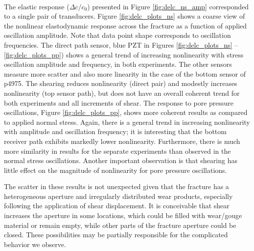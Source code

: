 \documentclass[letterpaper,10pt]{article}
\begin{document}
	\paragraph{}
	The elastic response ($ \Delta c/c_0 $) presented in Figure \ref{fig:delc_ns_amp} corresponded to a single pair of transducers. 
	Figure \ref{fig:delc_plots_ns} shows a coarse view of the nonlinear elastodynamic response across the fracture as a function of applied oscillation amplitude. Note that data point shape corresponds to oscillation frequencies. The direct path sensor, blue PZT in Figures \ref{fig:delc_plots_ns} -- \ref{fig:delc_plots_pp}) shows a general trend of increasing nonlinearity with stress oscillation amplitude and frequency, in both experiments. The other sensors measure more scatter and also more linearity in the case of the bottom sensor of p4975. The shearing reduces nonlinearity (direct pair) and modestly increases nonlinearity (top sensor path), but does not have an overall coherent trend for both experiments and all increments of shear.
	The response to pore pressure oscillations, Figure \ref{fig:delc_plots_pp}, shows more coherent results as compared to applied normal stress. Again, there is a general trend in increasing nonlinearity with amplitude and oscillation frequency; it is interesting that the bottom receiver path exhibits markedly lower nonlinearity. Furthermore, there is much more similarity in results for the separate experiments than observed in the normal stress oscillations. Another important observation is that shearing has little effect on the magnitude of nonlinearity for pore pressure oscillations.
	
	The scatter in these results is not unexpected given that the fracture has a heterogeneous aperture and irregularly distributed wear products, especially following the application of shear displacement. It is conceivable that shear increases the aperture in some locations, which could be filled with wear/gouge material or remain empty, while other parts of the fracture aperture could be closed. These possibilities may be partially responsible for the complicated behavior we observe.
	
\end{document}
